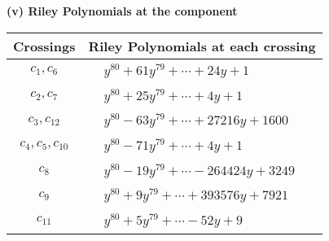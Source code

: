 \documentclass[1p]{elsarticle_modified}
\theoremstyle{definition}
\begin{document}
\newpage\renewcommand{\arraystretch}{1}
\flushleft \textbf{(v) Riley Polynomials at the component}\newline \\
\begin{tabular}{m{50pt}|m{274pt}}
Crossings & \hspace{64pt}Riley Polynomials at each crossing \\
\hline $$\begin{aligned}c_{1},c_{6}\end{aligned}$$&$\begin{aligned}
&y^{80}+61 y^{79}+\cdots+24 y+1
\end{aligned}$\\
\hline $$\begin{aligned}c_{2},c_{7}\end{aligned}$$&$\begin{aligned}
&y^{80}+25 y^{79}+\cdots+4 y+1
\end{aligned}$\\
\hline $$\begin{aligned}c_{3},c_{12}\end{aligned}$$&$\begin{aligned}
&y^{80}-63 y^{79}+\cdots+27216 y+1600
\end{aligned}$\\
\hline $$\begin{aligned}c_{4},c_{5},c_{10}\end{aligned}$$&$\begin{aligned}
&y^{80}-71 y^{79}+\cdots+4 y+1
\end{aligned}$\\
\hline $$\begin{aligned}c_{8}\end{aligned}$$&$\begin{aligned}
&y^{80}-19 y^{79}+\cdots-264424 y+3249
\end{aligned}$\\
\hline $$\begin{aligned}c_{9}\end{aligned}$$&$\begin{aligned}
&y^{80}+9 y^{79}+\cdots+393576 y+7921
\end{aligned}$\\
\hline $$\begin{aligned}c_{11}\end{aligned}$$&$\begin{aligned}
&y^{80}+5 y^{79}+\cdots-52 y+9
\end{aligned}$\\
\hline
\end{tabular}\\~\\
\end{document}
